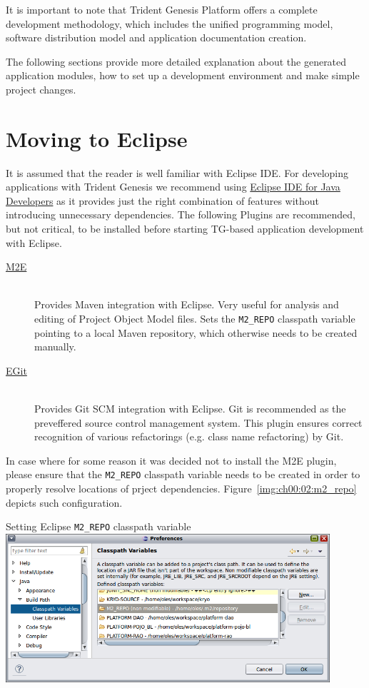   It is important to note that Trident Genesis Platform offers a complete development methodology, which includes the unified programming model, software distribution model and application documentation creation.
  
  The following sections provide more detailed explanation about the generated application modules, how to set up a development environment and make simple project changes.

\section{Moving to Eclipse}
  It is assumed that the reader is well familiar with Eclipse IDE.
  For developing applications with Trident Genesis we recommend using \href{http://www.eclipse.org/downloads}{Eclipse IDE for Java Developers} as it provides just the right combination of features without introducing unnecessary dependencies.
  The following Plugins are recommended, but not critical, to be installed before starting TG-based application development with Eclipse.

  \begin{description}
    \item[\href{http://www.eclipse.org/m2e/}{M2E}] \hfill \\
	Provides Maven integration with Eclipse. 
	Very useful for analysis and editing of Project Object Model files.
	Sets the \texttt{M2\_REPO} classpath variable pointing to a local Maven repository, which otherwise needs to be created manually.
    \item[\href{http://www.eclipse.org/egit/}{EGit}] \hfill \\
	Provides Git SCM integration with Eclipse. 
	Git is recommended as the preveffered source control management system. 
	This plugin ensures correct recognition of various refactorings (e.g. class name refactoring) by Git.
  \end{description}

  In case where for some reason it was decided not to install the M2E plugin, please ensure that the \texttt{M2\_REPO} classpath variable needs to be created in order to properly resolve locations of prject dependencies. 
  Figure~\ref{img:ch00:02:m2_repo} depicts such configuration.

  \begin{image}{Setting Eclipse \texttt{M2\_REPO} classpath variable}{\label{img:ch00:02:m2_repo}}    
    \includegraphics[width=0.9\textwidth]{parts/00-part/chapters/01-application-modules/images/06-eclipse-m2-variable.png}
  \end{image}

